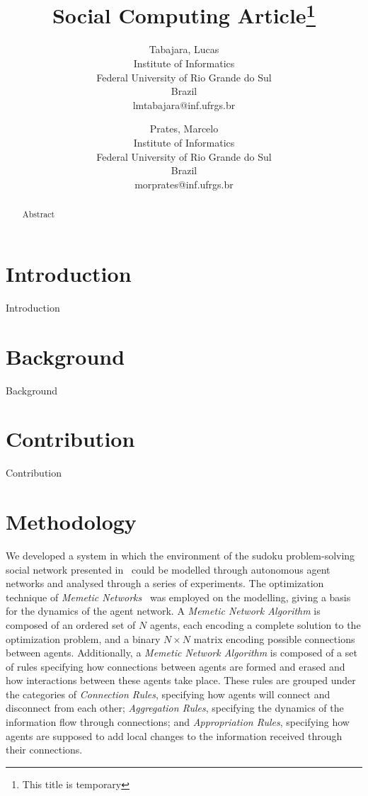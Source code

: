 \documentclass{article}
\title{Social Computing Article\thanks{This title is temporary}}
\author{Tabajara, Lucas \\
Institute of Informatics \\
Federal University of Rio Grande do Sul\\
Brazil \\
lmtabajara@inf.ufrgs.br
\and
Prates, Marcelo \\
Institute of Informatics \\
Federal University of Rio Grande do Sul\\
Brazil \\
morprates@inf.ufrgs.br}
\begin{document}
\maketitle

\begin{abstract}
  Abstract
\end{abstract}

\section{Introduction}

Introduction

\section{Background}

Background

\section{Contribution}

Contribution

\section{Methodology}

We developed a system in which the environment of the sudoku problem-solving social network presented in~\cite{farenzena:collabem} could be modelled through autonomous agent networks and analysed through a series of experiments. The optimization technique of {\em Memetic Networks}~\cite{lamb:memenet} was employed on the modelling, giving a basis for the dynamics of the agent network. A {\em Memetic Network Algorithm} is composed of an ordered set of $N$ agents, each encoding a complete solution to the optimization problem, and a binary $N \times N$ matrix encoding possible connections between agents. Additionally, a {\em Memetic Network Algorithm} is composed of a set of rules specifying how connections between agents are formed and erased and how interactions between these agents take place. These rules are grouped under the categories of {\em Connection Rules}, specifying how agents will connect and disconnect from each other; {\em Aggregation Rules}, specifying the dynamics of the information flow through connections; and {\em Appropriation Rules}, specifying how agents are supposed to add local changes to the information received through their connections.
\end{document}
